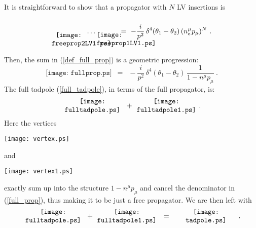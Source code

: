 \documentclass[a4paper,12pt]{article}
\begin{document}
	It is straightforward to show that a propagator with $ N $
	LV insertions is
\begin{equation}
\label{N_LV_prop}
	\begin{minipage}[c]{1.7cm}
	\vspace{0.8cm}
	\centering
	\texttt{[image: freeprop2LV1.ps]}
	\end{minipage}
		\ldots
	\begin{minipage}[c]{1.0cm}
	\vspace{0.78cm}
	\centering
	\texttt{[image: freeprop1LV1.ps]} 
	\end{minipage}
	~=~ 
	- \frac{i}{p^2}\, \delta^4(\theta_1 - \theta_2)\,
	    (n_e^\mu p_\mu)^N  
	~.
\end{equation}

	Then, the sum in (\ref{def_full_prop}) is a 
	geometric progression: 
\begin{equation}
\label{full_prop}
	\texttt{[image: fullprop.ps]}
	 \;~=~\;
	- \frac{i}{p^2}\,
		\delta^4 (\theta_1 - \theta_2)\,
		\frac{1}
	           {1 - n^\mu p_\mu}
	~.
\end{equation}
	The full tadpole (\ref{full_tadpole}), in terms of the 
	full propagator, is:
\[
\begin{minipage}[c]{3.0cm}
\centering
\texttt{[image: fulltadpole.ps]} 
\end{minipage}
	~+~
\begin{minipage}[c]{3.0cm}
\centering
\texttt{[image: fulltadpole1.ps]} 
\end{minipage}
	~.
\]
	Here the vertices
\begin{minipage}[b]{1.5cm}
\centering
\texttt{[image: vertex.ps]} 
\vspace{-0.1cm}
\end{minipage}
	and
\begin{minipage}[b]{1.5cm}
\centering
\texttt{[image: vertex1.ps]} 
\vspace{-0.1cm}
\end{minipage}
	exactly sum up into the structure 
$ 1 - n^\mu p_\mu $
	and cancel the denominator in (\ref{full_prop}),
	thus making it to be just a free propagator.
	We are then left with
\begin{equation}
\label{cancellation}
	\begin{minipage}[c]{3.0cm}
	\centering
	\texttt{[image: fulltadpole.ps]} 
	\end{minipage}
		~+~
	\begin{minipage}[c]{3.0cm}
	\centering
	\texttt{[image: fulltadpole1.ps]} 
	\end{minipage}
		~~=~~
	\begin{minipage}[c]{3.0cm}
	\centering
	\texttt{[image: tadpole.ps]} 
	\end{minipage}
	~.
\end{equation}
\end{document}
